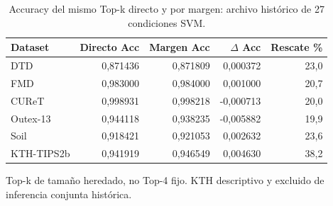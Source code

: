 \begin{table}[!htbp]\centering
\fontsize{9}{11}\selectfont\setlength{\tabcolsep}{4pt}
\caption{Accuracy del mismo Top-k directo y por margen: archivo histórico de 27 condiciones SVM.}\label{tab:tm-cascada}
\begin{tabular}{@{}lrrrr@{}}\toprule
Dataset & Directo Acc & Margen Acc & $\Delta$ Acc & Rescate \%\\\midrule
DTD & 0,871436 & 0,871809 & 0,000372 & 23,0\\
FMD & 0,983000 & 0,984000 & 0,001000 & 20,7\\
CUReT & 0,998931 & 0,998218 & -0,000713 & 20,0\\
Outex-13 & 0,944118 & 0,938235 & -0,005882 & 19,9\\
Soil & 0,918421 & 0,921053 & 0,002632 & 23,6\\
KTH-TIPS2b & 0,941919 & 0,946549 & 0,004630 & 38,2\\
\bottomrule\end{tabular}
\par\smallskip\begin{minipage}{0.98\textwidth}\footnotesize Top-k de tamaño heredado, no Top-4 fijo. KTH descriptivo y excluido de inferencia conjunta histórica.\end{minipage}
\end{table}
